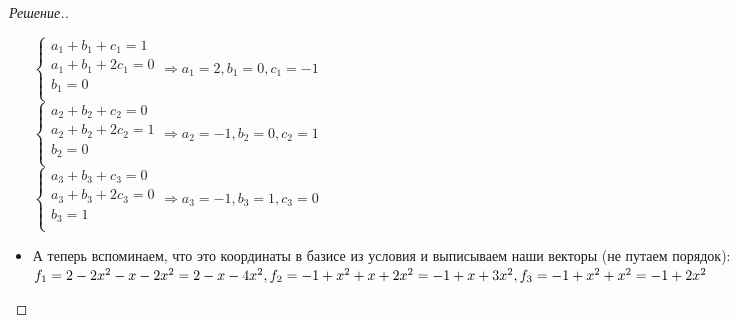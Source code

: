 \documentclass[a4paper]{article}
\theoremstyle{remark}
\begin{document}
\begin{proof}[Решение.]
\begin{itemize}
      $\begin{cases}
          a_1 + b_1 + c_1 = 1 \\
          a_1 + b_1 + 2c_1 = 0 \\
          b_1 = 0 \\
      \end{cases} \Rightarrow a_1 = 2, b_1 = 0, c_1 = -1$ \\
      $\begin{cases}
        a_2 + b_2 + c_2 = 0 \\
        a_2 + b_2 + 2c_2 = 1 \\
        b_2 = 0 \\ 
    \end{cases} \Rightarrow a_2 = -1, b_2 = 0, c_2 = 1$ \\
    $\begin{cases}
      a_3 + b_3 + c_3 = 0 \\
      a_3 + b_3 + 2c_3 = 0 \\
      b_3 = 1 \\ 
  \end{cases} \Rightarrow a_3 = -1, b_3 = 1, c_3 = 0$ 
  \item А теперь вспоминаем, что это координаты в базисе из условия и выписываем
  наши векторы (не путаем порядок): $f_1 = 2 - 2x^2 - x -2x^2 = 2 - x -4x^2, \\
  f_2 = -1 + x^2  + x + 2x^2 = -1 + x + 3x^2, \\
  f_3 = -1 + x^2 + x^2 = -1 + 2x^2$ 
          \end{itemize}
        \end{proof}
    
\end{document}
